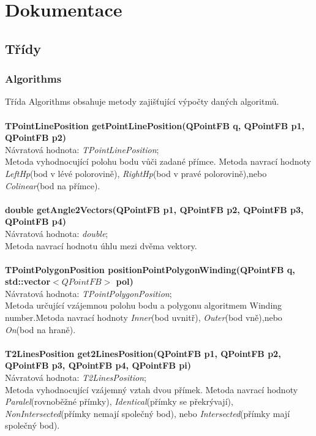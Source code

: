 \documentclass[a4paper, 12pt]{article}
\begin{document}
\section{Dokumentace}
\subsection{Třídy}
\subsubsection{Algorithms}
Třída Algorithms obsahuje metody zajišťující výpočty daných algoritmů.\\
\\
\textbf{TPointLinePosition getPointLinePosition(QPointFB q, QPointFB p1, QPointFB p2)}\\
Návratová hodnota: \textit{TPointLinePosition};\\
Metoda vyhodnocující polohu bodu vůči zadané přímce. Metoda navrací hodnoty \textit{LeftHp}(bod v lévé polorovině), \textit{RightHp}(bod v pravé polorovině),nebo \textit{Colinear}(bod na přímce). \\
\\
\textbf{double getAngle2Vectors(QPointFB p1, QPointFB p2, QPointFB p3, QPointFB p4)}\\
Návratová hodnota: \textit{double};\\
Metoda navrací hodnotu úhlu mezi dvěma vektory.\\
\\
\textbf{TPointPolygonPosition positionPointPolygonWinding(QPointFB q, std::vector$<QPointFB>$ pol)}\\
Návratová hodnota: \textit{TPointPolygonPosition};\\
Metoda určující vzájemnou polohu bodu a polygonu algoritmem Winding number.Metoda navrací hodnoty \textit{Inner}(bod uvnitř), \textit{Outer}(bod vně),nebo \textit{On}(bod na hraně). \\
\\
\textbf{T2LinesPosition get2LinesPosition(QPointFB p1, QPointFB p2, QPointFB p3, QPointFB p4, QPointFB pi)}\\
Návratová hodnota: \textit{T2LinesPosition};\\
Metoda vyhodnocující vzájemný vztah dvou přímek. Metoda navrací hodnoty \textit{Paralel}(rovnoběžné přímky), \textit{Identical}(přímky se překrývají), \textit{NonIntersected}(přímky nemají společný bod), nebo \textit{Intersected}(přímky mají společný bod). \\
\\
\end{document}
